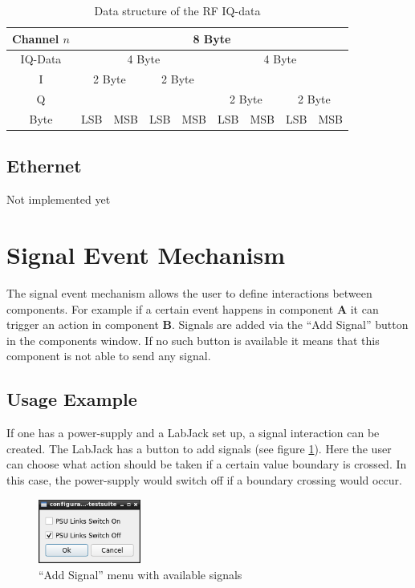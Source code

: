 \documentclass[10pt,a4paper]{article}
\begin{document}
		\begin{table}[H]
		\centering
		\begin{tabular}{c|cc|cc|cc|cc}
		\toprule
		Channel $n$	& \multicolumn{8}{c}{8 Byte}\\ \midrule
		IQ-Data		& \multicolumn{4}{c|}{4 Byte} & \multicolumn{4}{c}{4 Byte} \\ \hline 
		I	& \multicolumn{2}{c}{2 Byte} & \multicolumn{2}{c|}{2 Byte} & \multicolumn{4}{c}{} \\ 
		Q	& \multicolumn{4}{c|}{} & \multicolumn{2}{c}{2 Byte} & \multicolumn{2}{c}{2 Byte} \\  \hline
		Byte		& LSB & MSB & LSB & MSB & LSB & MSB & LSB & MSB \\ \bottomrule
		\end{tabular}
		\caption{Data structure of the RF IQ-data}
		\label{t:rf_data}
		\end{table}
		
	\newpage
	\subsection{Ethernet}
	Not implemented yet

\newpage
\section{Signal Event Mechanism}
\label{c:signal_event_mechanism}

The signal event mechanism allows the user to define interactions between components. For example if a certain event happens in component \textbf{A} it can trigger an action in component \textbf{B}. Signals are added via the \enquote{Add Signal} button in the components window. If no such button is available it means that this component is not able to send any signal.

	\subsection{Usage Example}
	
	If one has a power-supply and a LabJack set up, a signal interaction can be created. The LabJack has a button to add signals (see figure \ref{f:sem_menu}). Here the user can choose what action should be taken if a certain value boundary is crossed. In this case, the power-supply would switch off if a boundary crossing would occur.
	
	\begin{figure}[H]
	\centering
	\includegraphics[width=0.3\textwidth]{./5_sem_menu.png}
	\caption{\enquote{Add Signal} menu with available signals}
	\label{f:sem_menu}
	\end{figure}
\end{document}
